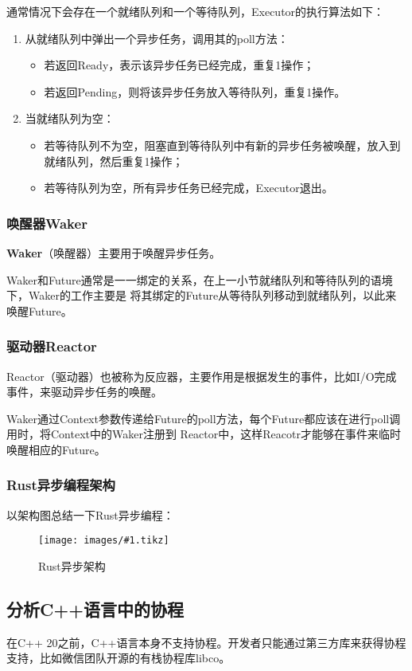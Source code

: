 \documentclass[supercite]{HustGraduPaper}
\newcommand{\cfig}[3]{
  \begin{figure}[htb]
    \centering
    \texttt{[image: images/\#1.tikz]}
    \caption{#3}
    \label{fig:#1}
  \end{figure}
}
\theoremstyle{definition}
\begin{document}
通常情况下会存在一个就绪队列和一个等待队列，Executor的执行算法如下：
\begin{enumerate}
  \item 从就绪队列中弹出一个异步任务，调用其的poll方法：
    \begin{itemize}
      \item 若返回Ready，表示该异步任务已经完成，重复1操作；
      \item 若返回Pending，则将该异步任务放入等待队列，重复1操作。
    \end{itemize}
  \item 当就绪队列为空：
    \begin{itemize}
      \item 若等待队列不为空，阻塞直到等待队列中有新的异步任务被唤醒，放入到就绪队列，然后重复1操作；
      \item 若等待队列为空，所有异步任务已经完成，Executor退出。
    \end{itemize}
\end{enumerate}

\subsubsection{唤醒器Waker}
\textbf{Waker}（唤醒器）主要用于唤醒异步任务。\par

Waker和Future通常是一一绑定的关系，在上一小节就绪队列和等待队列的语境下，Waker的工作主要是
将其绑定的Future从等待队列移动到就绪队列，以此来唤醒Future。\par

\subsubsection{驱动器Reactor}
Reactor（驱动器）也被称为反应器，主要作用是根据发生的事件，比如I/O完成事件，来驱动异步任务的唤醒。\par

Waker通过Context参数传递给Future的poll方法，每个Future都应该在进行poll调用时，将Context中的Waker注册到
Reactor中，这样Reacotr才能够在事件来临时唤醒相应的Future。\par

\subsubsection{Rust异步编程架构}
以架构图总结一下Rust异步编程：

\cfig{rust-async}{0.9}{Rust异步架构}

\subsection{分析C++语言中的协程}
在C++ 20之前，C++语言本身不支持协程。开发者只能通过第三方库来获得协程支持，比如微信团队开源的有栈协程库libco。\par
\end{document}
